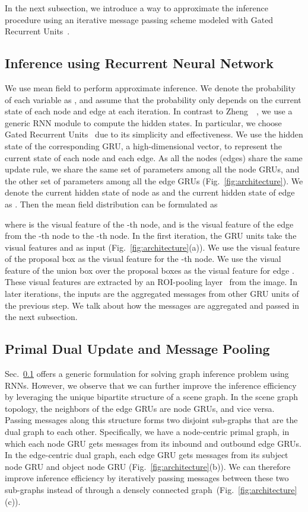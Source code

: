\documentclass[10pt,twocolumn,letterpaper]{article}
\begin{document}
In the next subsection, we introduce a way to approximate the inference procedure using an iterative message passing scheme modeled with Gated Recurrent Units~\cite{gru}.


\subsection{Inference using Recurrent Neural Network}
\label{sec:rnn}

We use mean field to perform approximate inference. We denote the probability of each variable  as , and assume
that the probability only depends on the current state of each node and edge at each iteration.
In contrast to Zheng~\etal~\cite{crfasrnn}, we use a generic RNN module to compute the hidden states. In particular, we choose Gated Recurrent Units~\cite{gru} due to its simplicity and effectiveness. We use the hidden state of the corresponding GRU, a high-dimensional vector, to represent the current state of each node and each edge. 
As all the nodes (edges) share the same update rule, we share the same set of parameters among all the node GRUs, and the other set of parameters among all the edge GRUs (Fig.~\ref{fig:architecture}). 
 We denote the current hidden state of node  as  and the current hidden state of edge  as .
Then the mean field distribution can be formulated as

where  is the visual feature of the -th node, and   is the visual feature of the edge from the -th node to the -th node.  
In the first iteration, the GRU units take the visual features  and  as input (Fig.~\ref{fig:architecture}(a)).
We use the visual feature of the proposal box as the visual feature  for the -th node. We use the visual feature of the union box over the proposal boxes  as the visual feature  for edge . These visual features are extracted by an ROI-pooling layer~\cite{FASTRCNN} from the image. In later iterations, the inputs are the aggregated messages from other GRU units of the previous step. We talk about how the messages are aggregated and passed in the next subsection. 



\subsection{Primal Dual Update and Message Pooling}
\label{sec:primal_dual}
Sec.~\ref{sec:rnn} offers a generic formulation for solving graph inference problem using RNNs. However, we observe that we can further improve the inference efficiency by leveraging the unique bipartite structure of a scene graph. In the scene graph topology, the neighbors of the edge GRUs are node GRUs, and vice versa. Passing messages along this structure forms two disjoint sub-graphs that are the dual graph to each other. Specifically, we have a node-centric primal graph, in which each node GRU gets messages from its inbound and outbound edge GRUs. In the edge-centric dual graph, each edge GRU gets messages from its subject node GRU and object node GRU (Fig.~\ref{fig:architecture}(b)). We can therefore improve inference efficiency by iteratively passing messages between these two sub-graphs instead of through a densely connected graph~(Fig.~\ref{fig:architecture}(c)).
\end{document}

